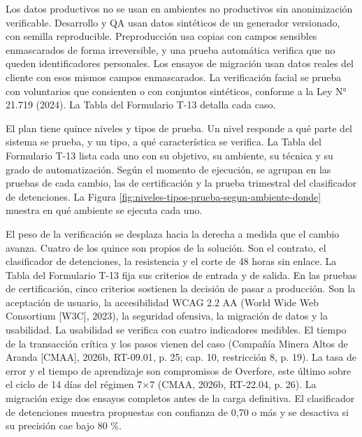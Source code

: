 \documentclass[subdoc]{../../comun/overfore}
\begin{document}
Los datos productivos no se usan en ambientes no productivos sin anonimización verificable. Desarrollo y QA usan datos sintéticos de un generador versionado, con semilla reproducible. Preproducción usa copias con campos sensibles enmascarados de forma irreversible, y una prueba automática verifica que no queden identificadores personales. Los ensayos de migración usan datos reales del cliente con esos mismos campos enmascarados. La verificación facial se prueba con voluntarios que consienten o con conjuntos sintéticos, conforme a la Ley N° 21.719 (2024). La Tabla  del Formulario T-13 detalla cada caso.

El plan tiene quince niveles y tipos de prueba. Un nivel responde a qué parte del sistema se prueba, y un tipo, a qué característica se verifica. La Tabla  del Formulario T-13 lista cada uno con su objetivo, su ambiente, su técnica y su grado de automatización. Según el momento de ejecución, se agrupan en las pruebas de cada cambio, las de certificación y la prueba trimestral del clasificador de detenciones. La Figura \ref{fig:niveles-tipos-prueba-segun-ambiente-donde} muestra en qué ambiente se ejecuta cada uno.

El peso de la verificación se desplaza hacia la derecha a medida que el cambio avanza. Cuatro de los quince son propios de la solución. Son el contrato, el clasificador de detenciones, la resistencia y el corte de 48 horas sin enlace. La Tabla  del Formulario T-13 fija sus criterios de entrada y de salida. En las pruebas de certificación, cinco criterios sostienen la decisión de pasar a producción. Son la aceptación de usuario, la accesibilidad WCAG 2.2 AA (World Wide Web Consortium [W3C], 2023), la seguridad ofensiva, la migración de datos y la usabilidad. La usabilidad se verifica con cuatro indicadores medibles. El tiempo de la transacción crítica y los pasos vienen del caso (Compañía Minera Altos de Aranda [CMAA], 2026b, RT-09.01, p. 25; cap. 10, restricción 8, p. 19). La tasa de error y el tiempo de aprendizaje son compromisos de Overfore, este último sobre el ciclo de 14 días del régimen 7×7 (CMAA, 2026b, RT-22.04, p. 26). La migración exige dos ensayos completos antes de la carga definitiva. El clasificador de detenciones muestra propuestas con confianza de 0,70 o más y se desactiva si su precisión cae bajo 80 \%.
\end{document}
